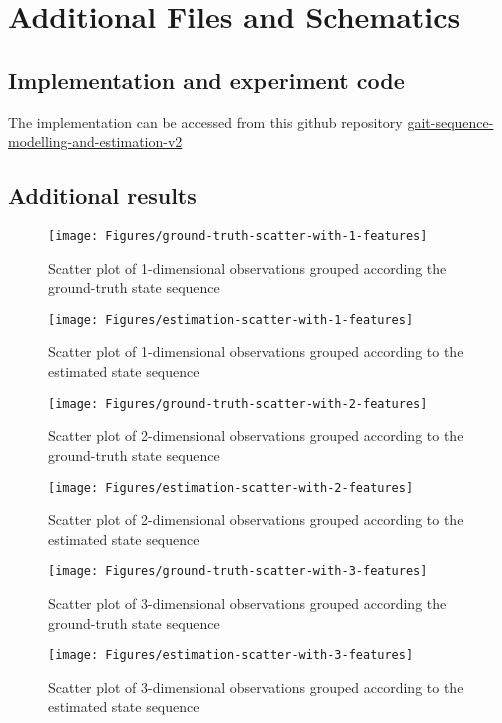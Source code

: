 \chapter{Additional Files and Schematics}

\section{Implementation and experiment code} \label{apdix-repo}
The implementation can be accessed from this github repository \href{https://github.com/h-kouame/gait-sequence-modelling-and-estimation-v2}{gait-sequence-modelling-and-estimation-v2}

\section{Additional results} \label{apdix-results}

\begin{figure}[ht!]
	\texttt{[image: Figures/ground-truth-scatter-with-1-features]}
	\caption{Scatter plot of  1-dimensional observations grouped according the ground-truth state sequence}
	\label{fig:gt-1dim}
\end{figure}
\begin{figure}[ht!]
	\texttt{[image: Figures/estimation-scatter-with-1-features]}
	\caption{Scatter plot of 1-dimensional observations grouped according to the estimated state sequence}
	\label{fig:es-1dim}
\end{figure}

\begin{figure}[ht!]
	\texttt{[image: Figures/ground-truth-scatter-with-2-features]}
	\caption{Scatter plot of 2-dimensional observations grouped according to the ground-truth state sequence}
	\label{fig:gt-2dim}
\end{figure}

\begin{figure}[ht!]
	\texttt{[image: Figures/estimation-scatter-with-2-features]}
	\caption{Scatter plot of 2-dimensional observations grouped according to the estimated state sequence}
	\label{fig:es-2dim}
\end{figure}

\begin{figure}[ht!]
	\texttt{[image: Figures/ground-truth-scatter-with-3-features]}
	\caption{Scatter plot of  3-dimensional observations grouped according the ground-truth state sequence}
	\label{fig:gt-3dim}
\end{figure}
\begin{figure}[ht!]
	\texttt{[image: Figures/estimation-scatter-with-3-features]}
	\caption{Scatter plot of 3-dimensional observations grouped according to the estimated state sequence}
	\label{fig:es-3dim}
\end{figure}

